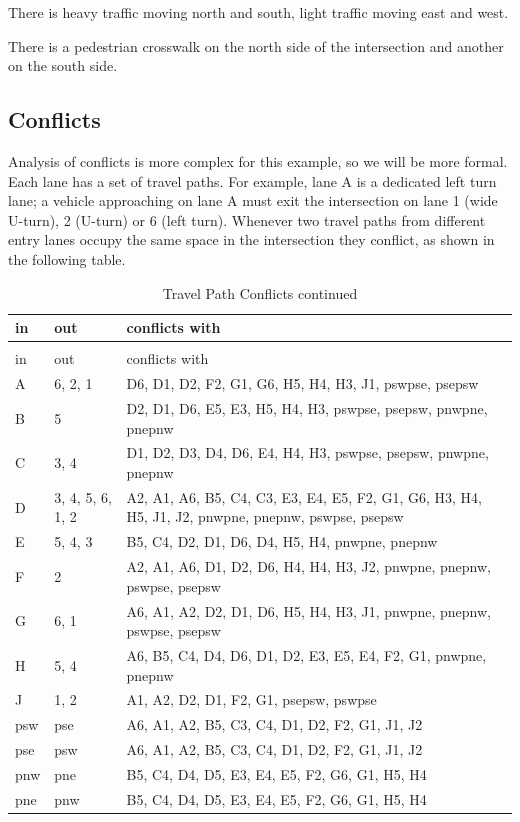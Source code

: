 \documentclass[letterpaper,twoside]{article}
\begin{document}
There is heavy traffic moving north and south,
light traffic moving east and west.

There is a pedestrian crosswalk on the north side of the intersection
and another on the south side.

\subsection{Conflicts}

Analysis of conflicts is more complex for this example, so we
will be more formal.  Each lane has a set of travel paths.
For example, lane A is a dedicated left turn lane; a vehicle approaching on
lane A must exit the intersection on lane 1 (wide U-turn), 2 (U-turn)
or 6 (left turn).  Whenever two travel paths from different entry lanes
occupy the same space in the intersection they conflict,
as shown in the following table.

\begin{longtable}{l | l | p{8cm}}
  \caption{Travel Path Conflicts} \\
  in & out & conflicts with \\ \hline \endfirsthead
  \caption{Travel Path Conflicts continued} \\
  in & out & conflicts with \\ \hline \endhead
  A & 6, 2, 1 & D6, D1, D2, F2, G1, G6, H5, H4, H3, J1, pswpse, psepsw \\
  B & 5 & D2, D1, D6, E5, E3, H5, H4, H3, pswpse, psepsw, pnwpne, pnepnw \\
  C & 3, 4 & D1, D2, D3, D4, D6, E4, H4, H3, pswpse, psepsw, pnwpne, pnepnw \\
  D & 3, 4, 5, 6, 1, 2 & A2, A1, A6, B5, C4, C3, E3, E4, E5, F2, G1, G6, H3,
  H4, H5, J1, J2, pnwpne, pnepnw, pswpse, psepsw \\
  E & 5, 4, 3 & B5, C4, D2, D1, D6, D4, H5, H4, pnwpne, pnepnw  \\
  F & 2 & A2, A1, A6, D1, D2, D6, H4, H4, H3, J2, pnwpne, pnepnw, pswpse,
  psepsw \\
  G & 6, 1 & A6, A1, A2, D2, D1, D6, H5, H4, H3, J1, pnwpne, pnepnw, pswpse,
  psepsw \\
  H & 5, 4 & A6, B5, C4, D4, D6, D1, D2, E3, E5, E4, F2, G1, pnwpne, pnepnw \\
  J & 1, 2 & A1, A2, D2, D1, F2, G1, psepsw, pswpse \\
  psw & pse & A6, A1, A2, B5, C3, C4, D1, D2, F2, G1, J1, J2 \\
  pse & psw & A6, A1, A2, B5, C3, C4, D1, D2, F2, G1, J1, J2 \\
  pnw & pne & B5, C4, D4, D5, E3, E4, E5, F2, G6, G1, H5, H4 \\
  pne & pnw & B5, C4, D4, D5, E3, E4, E5, F2, G6, G1, H5, H4 \\
\end{longtable}
\end{document}

